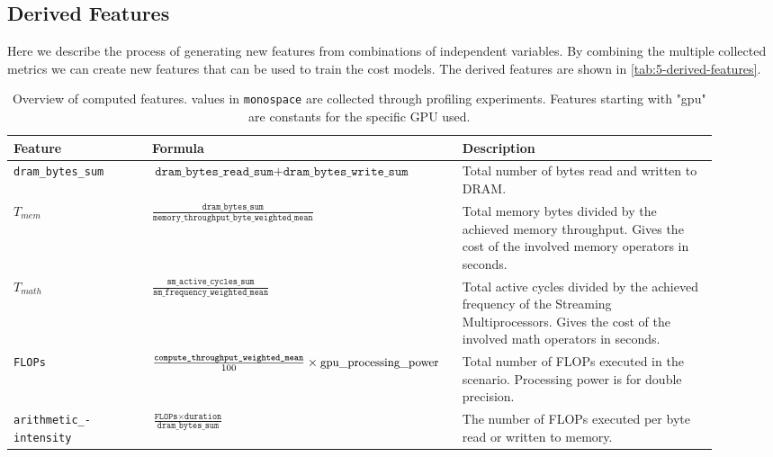 \subsection{Derived Features}
Here we describe the process of generating new features from combinations of independent variables. By combining the multiple collected metrics we can create new features that can be used to train the cost models. The derived features are shown in \autoref{tab:5-derived-features}.

\begin{table}[ht]
    \centering
    \begin{tabular}{p{0.19\linewidth}p{0.37\linewidth}p{0.35\linewidth}}
        \toprule
        Feature                                   & Formula                                                                                                 & Description                                                                                                                                       \\
        \midrule\midrule
        \texttt{dram\_bytes\_sum}                 & $\texttt{dram\_bytes\_read\_sum} + \texttt{dram\_bytes\_write\_sum}$                                    & Total number of bytes read and written to DRAM.                                                                                                   \\
        $T_{mem}$                                 & $\frac{\texttt{dram\_bytes\_sum}}{\texttt{memory\_throughput\_byte\_weighted\_mean}}$                   & Total memory bytes divided by the achieved memory throughput. Gives the cost of the involved memory operators in seconds.                         \\
        $T_{math}$                                & $\frac{\texttt{sm\_active\_cycles\_sum}}{\texttt{sm\_frequency\_weighted\_mean}}$                       & Total active cycles divided by the achieved frequency of the Streaming Multiprocessors. Gives the cost of the involved math operators in seconds. \\
        \texttt{FLOPs}                            & $\frac{\texttt{compute\_throughput\_weighted\_mean}}{100} \times \text{\small{gpu\_processing\_power}}$ & Total number of FLOPs executed in the scenario. Processing power is for double precision.                                                         \\
        \texttt{arithmetic\_-} \texttt{intensity} & $\frac{\texttt{FLOPs} \times \texttt{duration}}{\texttt{dram\_bytes\_sum}}$                             & The number of FLOPs executed per byte read or written to memory.                                                                                  \\

        \bottomrule
    \end{tabular}
    \caption[Derived features]{Overview of computed features. values in \texttt{monospace} are collected through profiling experiments. Features starting with "gpu" are constants for the specific GPU used.}
    \label{tab:5-derived-features}
\end{table}




